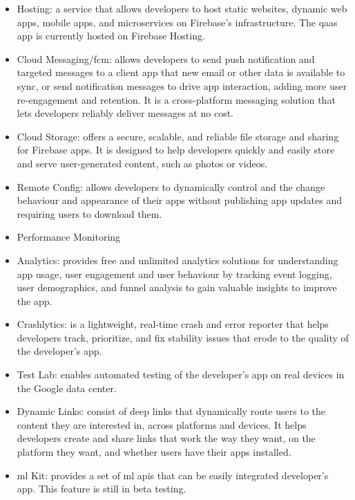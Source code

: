\begin{multicols}{2}
      \begin{itemize}
            \item Hosting: a service that allows developers to host static websites, dynamic web apps, mobile apps, and
                  microservices on Firebase's infrastructure. The \acrshort{qaas} app is currently hosted on Firebase
                  Hosting.
            \item Cloud Messaging/\acrshort{fcm}: allows developers to send push notification and targeted messages to a
                  client app that new email or other data is available to sync, or send notification messages to drive app
                  interaction, adding more user re-engagement and retention. It is a cross-platform messaging solution that lets
                  developers reliably deliver messages at no cost.
            \item Cloud Storage: offers a secure, scalable, and reliable file storage and sharing for Firebase apps.
                  It is designed to help developers quickly and easily store and serve user-generated content, such as
                  photos or videos.
            \item Remote Config: allows developers to dynamically control and the change behaviour and appearance of their apps
                  without publishing app updates and requiring users to download them.
            \item Performance Monitoring
            \item Analytics: provides free and unlimited analytics solutions for understanding app usage, user engagement and
                  user behaviour by tracking event logging, user demographics, and funnel analysis to gain valuable insights to
                  improve the app.
            \item Crashlytics: is a lightweight, real-time crash and error reporter that helps developers track, prioritize,
                  and fix stability issues that erode to the quality of the developer's app.
            \item Test Lab: enables automated testing of the developer's app on real devices in the Google data center.
            \item Dynamic Links: consist of deep links that dynamically route users to the content they are interested in,
                  across platforms and devices. It helps developers create and share links that work the way they want, on the
                  platform they want, and whether users have their apps installed.
            \item \acrshort{ml} Kit: provides a set of \acrshort{ml} \acrshort{api}s that can be easily integrated developer's app.
                  This feature is still in beta testing.
      \end{itemize}


\end{multicols}
